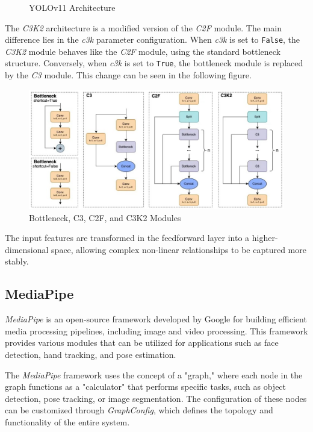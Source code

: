 \begin{figure}[H]
  \centering
  \resizebox{1\linewidth}{!}{
    
  }
  \caption{YOLOv11 Architecture}
  \label{fig:YOLOv11Architecture}
\end{figure}

The \emph{C3K2} architecture is a modified version of the \emph{C2F} module. The main difference lies in the \emph{c3k} parameter configuration. When \emph{c3k} is set to \texttt{False}, the \emph{C3K2} module behaves like the \emph{C2F} module, using the standard bottleneck structure. Conversely, when \emph{c3k} is set to \texttt{True}, the bottleneck module is replaced by the \emph{C3} module. This change can be seen in the following figure.

\begin{figure}[H]
  \centering
  \includegraphics[scale=0.35]{gambar/C3k2.jpg}
  \caption{Bottleneck, C3, C2F, and C3K2 Modules}
  \label{fig:c3k2}
\end{figure}

The input features are transformed in the feedforward layer into a higher-dimensional space, allowing complex non-linear relationships to be captured more stably.

\subsection{MediaPipe}
\label{subsec:MediaPipe}

\emph{MediaPipe} is an open-source framework developed by Google for building efficient media processing pipelines, including image and video processing. This framework provides various modules that can be utilized for applications such as face detection, hand tracking, and pose estimation.

The \emph{MediaPipe} framework uses the concept of a "graph," where each node in the graph functions as a "calculator" that performs specific tasks, such as object detection, pose tracking, or image segmentation. The configuration of these nodes can be customized through \emph{GraphConfig}, which defines the topology and functionality of the entire system.

